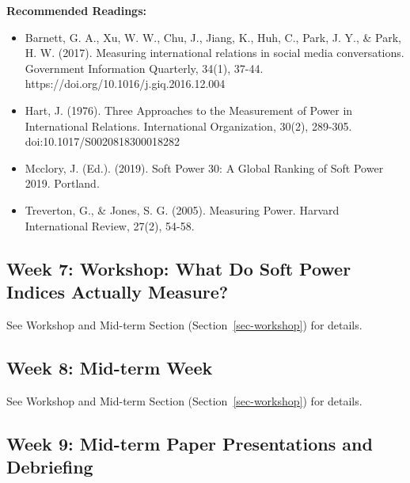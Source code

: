 \documentclass[
  letterpaper,
  DIV=11,
  numbers=noendperiod]{scrartcl}
\providecommand{\tightlist}{%
  \setlength{\itemsep}{0pt}\setlength{\parskip}{0pt}}\usepackage{longtable,booktabs,array}
\begin{document}
\textbf{Recommended Readings:}

\begin{itemize}
\tightlist
\item
  Barnett, G. A., Xu, W. W., Chu, J., Jiang, K., Huh, C., Park, J. Y.,
  \& Park, H. W. (2017). Measuring international relations in social
  media conversations. Government Information Quarterly, 34(1), 37-44.
  https://doi.org/10.1016/j.giq.2016.12.004
\item
  Hart, J. (1976). Three Approaches to the Measurement of Power in
  International Relations. International Organization, 30(2), 289-305.
  doi:10.1017/S0020818300018282
\item
  Mcclory, J. (Ed.). (2019). Soft Power 30: A Global Ranking of Soft
  Power 2019. Portland.
\item
  Treverton, G., \& Jones, S. G. (2005). Measuring Power. Harvard
  International Review, 27(2), 54-58.
\end{itemize}

\hypertarget{week-7-workshop-what-do-soft-power-indices-actually-measure}{%
\subsection*{Week 7: Workshop: What Do Soft Power Indices Actually
Measure?}\label{week-7-workshop-what-do-soft-power-indices-actually-measure}}

See Workshop and Mid-term Section (Section~\ref{sec-workshop}) for
details.

\hypertarget{week-8-mid-term-week}{%
\subsection*{Week 8: Mid-term Week}\label{week-8-mid-term-week}}

See Workshop and Mid-term Section (Section~\ref{sec-workshop}) for
details.

\hypertarget{week-9-mid-term-paper-presentations-and-debriefing}{%
\subsection*{Week 9: Mid-term Paper Presentations and
Debriefing}\label{week-9-mid-term-paper-presentations-and-debriefing}}
\end{document}
